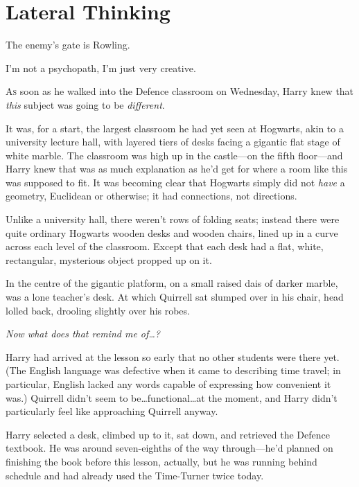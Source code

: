 \chapter{Lateral Thinking}

\begin{chapterOpeningAuthorNote}
The enemy’s gate is Rowling.
\end{chapterOpeningAuthorNote}
\begin{chapterOpeningQuote}
I’m not a psychopath, I’m just very creative.
\end{chapterOpeningQuote}

\lettrine{A}{s} soon as he walked into the Defence classroom on Wednesday, Harry knew that \emph{this} subject was going to be \emph{different}.

It was, for a start, the largest classroom he had yet seen at Hogwarts, akin to a university lecture hall, with layered tiers of desks facing a gigantic flat stage of white marble. The classroom was high up in the castle—on the fifth floor—and Harry knew that was as much explanation as he’d get for where a room like this was supposed to fit. It was becoming clear that Hogwarts simply did not \emph{have} a geometry, Euclidean or otherwise; it had connections, not directions.

Unlike a university hall, there weren’t rows of folding seats; instead there were quite ordinary Hogwarts wooden desks and wooden chairs, lined up in a curve across each level of the classroom. Except that each desk had a flat, white, rectangular, mysterious object propped up on it.

In the centre of the gigantic platform, on a small raised dais of darker marble, was a lone teacher’s desk. At which Quirrell sat slumped over in his chair, head lolled back, drooling slightly over his robes.

\emph{Now what does that remind me of…?}

Harry had arrived at the lesson so early that no other students were there yet. (The English language was defective when it came to describing time travel; in particular, English lacked any words capable of expressing how convenient it was.) Quirrell didn’t seem to be…functional…at the moment, and Harry didn’t particularly feel like approaching Quirrell anyway.

Harry selected a desk, climbed up to it, sat down, and retrieved the Defence textbook. He was around seven-eighths of the way through—he’d planned on finishing the book before this lesson, actually, but he was running behind schedule and had already used the Time-Turner twice today.

